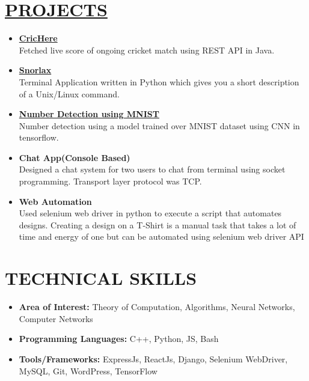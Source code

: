 \documentclass[line, margin, 12pt]{res}
\begin{document}
\begin{resume}
\begin{itemize}
\end{itemize}
\section{\hyperref[https://www.github.com/darshansharma]{PROJECTS}}
\begin{itemize}
\item \textbf{\href{https://github.com/darshansharma/CricHere/blob/master/src/test/Test.java}{CricHere}}\\
Fetched live score of ongoing cricket match using REST API in Java.
\item \textbf{\href{https://github.com/darshansharma/snorlax}{Snorlax}}\\
Terminal Application written in Python which gives you a short description of a Unix/Linux command.
\item \textbf{\href{https://github.com/darshansharma/machine-learning/}{Number Detection using MNIST}}\\
Number detection using a model trained over MNIST dataset using CNN in tensorflow.
\item \textbf{Chat App(Console Based)}\\
Designed a chat system for two users to chat from terminal using socket programming. Transport layer protocol was TCP.
\item \textbf{Web Automation} \\
Used selenium web driver in python to execute a script that automates designs.
Creating a design on a T-Shirt is a manual task that takes a lot of time and energy of one but can be automated using selenium web driver API\\
\end{itemize}

\section{TECHNICAL SKILLS}
\begin{itemize}
\item \textbf{Area of Interest:} Theory of Computation, Algorithms, Neural Networks, Computer Networks
\item \textbf{Programming Languages:} C++, Python, JS, Bash
\item \textbf{Tools/Frameworks:} ExpressJs, ReactJs, Django, Selenium WebDriver, MySQL, Git, WordPress, TensorFlow\\
\end{itemize}

\end{resume}
\end{document}
